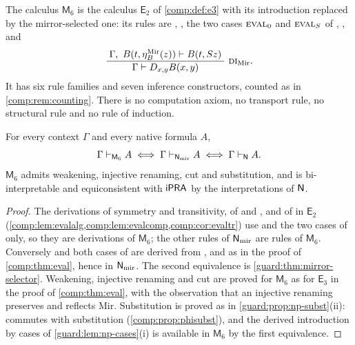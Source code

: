 \begin{definition}
\label{guard:def:m6}
The calculus $\mathsf M_6$ is the calculus $\mathsf E_2$ of
\cref{comp:def:e3} with its introduction  replaced by the
mirror-selected one: its rules are , , the two
cases $\rulename{Eval}_0$ and $\rulename{Eval}_{\Suc}$ of ,
,  and
\[
 \infrule{\Gamma,\ B(t,\eta^{\mathrm{Mir}}_B(z))\proves B(t,\Suc z)}
         {\Gamma\proves\D{x}{y}B(x,y)}\ \rulename{DI}_{\mathrm{Mir}} .
\]
It has six rule families and seven inference constructors, counted as in
\cref{comp:rem:counting}.  There is no computation axiom, no transport rule,
no structural rule and no rule of induction.
\end{definition}

\begin{theorem}
\label{guard:thm:m6}
For every context $\Gamma$ and every native formula $A$,
\[
 \Gamma\vdash_{\mathsf M_6}A\iff\Gamma\vdash_{\mathsf{N}_{\mathrm{mir}}}A
 \iff\Gamma\vdash_{\mathsf{N}}A .
\]
$\mathsf M_6$ admits weakening, injective renaming, cut and substitution,
and is bi-interpretable and equiconsistent with $\mathsf{iPRA}$ by the
interpretations of $\mathsf{N}$.
\end{theorem}

\begin{proof}
The derivations of symmetry and transitivity, of  and
, and of  in $\mathsf E_2$
(\cref{comp:lem:evalalg,comp:lem:evalcomp,comp:cor:evaltr}) use
 and the two cases of  only, so they are
derivations of $\mathsf M_6$; the other rules of $\mathsf{N}_{\mathrm{mir}}$ are
rules of $\mathsf M_6$.  Conversely  and both cases of
 are derived from ,  and
 as in the proof of \cref{comp:thm:eval}, hence in
$\mathsf{N}_{\mathrm{mir}}$.  The second equivalence is
\cref{guard:thm:mirror-selector}.  Weakening, injective renaming and cut
are proved for $\mathsf M_6$ as for $\mathsf E_3$ in the proof of \cref{comp:thm:eval}, with the
observation that an injective renaming preserves and reflects
$\mathrm{Mir}$.  Substitution is proved as in
\cref{guard:prop:np-subst}(ii):  commutes with substitution
(\cref{comp:prop:phisubst}), and the derived introduction by cases of
\cref{guard:lem:np-cases}(i) is available in $\mathsf M_6$ by the first
equivalence.
\end{proof}

